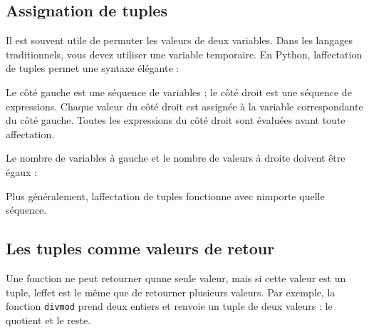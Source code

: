 \hypertarget{assignation-de-tuples}{%
\subsection{Assignation de tuples}\label{assignation-de-tuples}}

Il est souvent utile de permuter les valeurs de deux variables. Dans les
langages traditionnels, vous devez utiliser une variable temporaire. En
Python, l\textquotesingle affectation de tuples permet une syntaxe
élégante :

\begin{Shaded}
\begin{Highlighting}[]
\OperatorTok{\textgreater{}\textgreater{}\textgreater{}}\OperatorTok{=}
\end{Highlighting}
\end{Shaded}

Le côté gauche est une séquence de variables ; le côté droit est une
séquence de expressions. Chaque valeur du côté droit est assignée à la
variable correspondante du côté gauche. Toutes les expressions du côté
droit sont évaluées avant toute affectation.

Le nombre de variables à gauche et le nombre de valeurs à droite doivent
être égaux :

\begin{Shaded}
\begin{Highlighting}[]
\OperatorTok{\textgreater{}\textgreater{}\textgreater{}}\OperatorTok{=} \NormalTok{, }\NormalTok{, }
\end{Highlighting}
\end{Shaded}

Plus généralement, l\textquotesingle affectation de tuples fonctionne
avec n\textquotesingle importe quelle séquence.

\hypertarget{les-tuples-comme-valeurs-de-retour}{%
\subsection{Les tuples comme valeurs de
retour}\label{les-tuples-comme-valeurs-de-retour}}

Une fonction ne peut retourner qu\textquotesingle une seule valeur, mais
si cette valeur est un tuple, l\textquotesingle effet est le même que de
retourner plusieurs valeurs. Par exemple, la fonction \texttt{divmod}
prend deux entiers et renvoie un tuple de deux valeurs : le quotient et
le reste.

